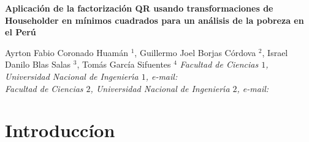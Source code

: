 \documentclass[twocolumn,twoside]{article}
\begin{document}
\begin{center}
 {\Large \textbf{Aplicaci\'on de la factorizaci\'on QR usando transformaciones de Householder en m\'inimos cuadrados para un an\'alisis 
 de la pobreza en el Per\'u}}
\end{center}
\begin{center}
 Ayrton Fabio Coronado Huam\'an $^1$, Guillermo Joel Borjas C\'ordova $^2$,
 Israel Danilo Blas Salas $^3$, Tom\'as Garc\'ia Sifuentes $^4$ \vskip12pt
{\it Facultad de Ciencias $1$, Universidad Nacional de Ingenier\'{\i}a $1$, e-mail: \\
Facultad de Ciencias $2$, Universidad Nacional de Ingenier\'{\i}a $2$, e-mail:  }
\end{center}

\section{Introducc\'ion}
\end{document}
